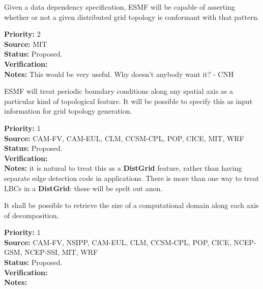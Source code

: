 
Given a data dependency specification, ESMF will be capable of
asserting whether or not a given distributed grid topology is
conformant with that pattern.

\begin{reqlist}
{\bf Priority:} 2 \\ 
{\bf Source:} MIT \\
{\bf Status:} Proposed. \\
{\bf Verification:} \\
{\bf Notes:} This would be very useful. Why doesn't anybody want it? - CNH
\end{reqlist}


ESMF will treat periodic boundary conditions along any spatial axis as
a particular kind of topological feature. It will be possible to
specify this as input information for grid topology generation.

\begin{reqlist}
{\bf Priority:} 1 \\ 
{\bf Source:} CAM-FV, CAM-EUL, CLM, CCSM-CPL, POP, CICE, MIT, WRF \\
{\bf Status:} Proposed. \\
{\bf Verification:} \\
{\bf Notes:} it is natural to treat this as a \textbf{DistGrid}
  feature, rather than having separate edge detection code in
  applications. There is more than one way to treat LBCs in a
  \textbf{DistGrid}: these will be spelt out anon.
   
\end{reqlist}




It shall be possible to retrieve the size of a computational domain
along each axis of decomposition.

\begin{reqlist}
{\bf Priority:} 1 \\ 
{\bf Source:} CAM-FV, NSIPP, CAM-EUL, CLM, CCSM-CPL, POP, CICE, NCEP-GSM, NCEP-SSI, MIT, WRF \\
{\bf Status:} Proposed. \\
{\bf Verification:} \\
{\bf Notes:}
\end{reqlist}

